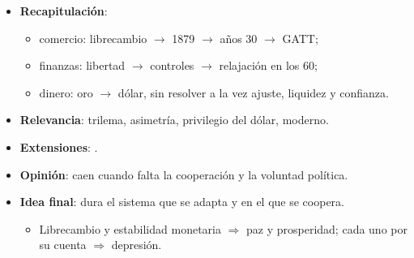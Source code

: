 \documentclass{article}
\begin{document}
\begin{columnas}
\begin{itemize}
\item \textbf{Recapitulación}:
  \begin{itemize}
  \item comercio: librecambio $\to$ 1879 $\to$ años 30 $\to$ GATT;
  \item finanzas: libertad $\to$ controles $\to$ relajación en los 60;
  \item dinero: oro $\to$ dólar, sin resolver a la vez ajuste, liquidez y confianza.
  \end{itemize}
\item \textbf{Relevancia}: trilema, asimetría, privilegio del dólar,  moderno.
\item \textbf{Extensiones}:      .
\item \textbf{Opinión}: caen cuando falta la cooperación y la voluntad política.
\item \textbf{Idea final}: dura el sistema que se adapta y en el que se coopera.
  \begin{itemize}
  \item Librecambio y estabilidad monetaria $\Rightarrow$ paz y prosperidad; cada uno por su cuenta $\Rightarrow$ depresión.
  \end{itemize}
\end{itemize}


\end{columnas}
\end{document}
